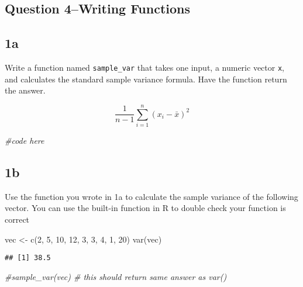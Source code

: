 \documentclass[
]{article}
\newenvironment{Shaded}{\begin{snugshade}}{\end{snugshade}}
\newcommand{\CommentTok}[1]{\textcolor[rgb]{0.56,0.35,0.01}{\textit{#1}}}
\newcommand{\DecValTok}[1]{\textcolor[rgb]{0.00,0.00,0.81}{#1}}
\newcommand{\FunctionTok}[1]{\textcolor[rgb]{0.00,0.00,0.00}{#1}}
\newcommand{\NormalTok}[1]{#1}
\newcommand{\OtherTok}[1]{\textcolor[rgb]{0.56,0.35,0.01}{#1}}
\begin{document}
\hypertarget{question-4writing-functions}{%
\subsection{Question 4--Writing
Functions}\label{question-4writing-functions}}

\hypertarget{a-3}{%
\subsection{1a}\label{a-3}}

Write a function named \texttt{sample\_var} that takes one input, a
numeric vector \texttt{x}, and calculates the standard sample variance
formula. Have the function return the answer.

\[\frac{1}{n-1} \sum_{i=1}^n (x_i - \bar{x})^2\]

\begin{Shaded}
\begin{Highlighting}[]
\CommentTok{\#code here}
\end{Highlighting}
\end{Shaded}

\hypertarget{b-3}{%
\subsection{1b}\label{b-3}}

Use the function you wrote in 1a to calculate the sample variance of the
following vector. You can use the built-in function in R to double check
your function is correct

\begin{Shaded}
\begin{Highlighting}[]
\NormalTok{vec }\OtherTok{\textless{}{-}} \FunctionTok{c}\NormalTok{(}\DecValTok{2}\NormalTok{, }\DecValTok{5}\NormalTok{, }\DecValTok{10}\NormalTok{, }\DecValTok{12}\NormalTok{, }\DecValTok{3}\NormalTok{, }\DecValTok{3}\NormalTok{, }\DecValTok{4}\NormalTok{, }\DecValTok{1}\NormalTok{, }\DecValTok{20}\NormalTok{)}
\FunctionTok{var}\NormalTok{(vec)}
\end{Highlighting}
\end{Shaded}

\begin{verbatim}
## [1] 38.5
\end{verbatim}

\begin{Shaded}
\begin{Highlighting}[]
\CommentTok{\#sample\_var(vec) \# this should return same answer as var()}
\end{Highlighting}
\end{Shaded}
\end{document}
